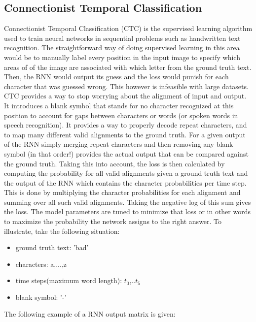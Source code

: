 \documentclass{article}
\begin{document}
\subsection{Connectionist Temporal Classification}
Connectionist Temporal Classification (CTC) is the supervised learning algorithm used to train neural networks in sequential problems such as handwritten text recognition\cite{Hannun}. The straightforward way of doing supervised learning in this area would be to manually label every position in the input image to specify which areas of of the image are associated with which letter from the ground truth text. Then, the RNN would output its guess and the loss would punish for each character that was guessed wrong. This however is infeasible with large datasets. CTC provides a way to stop worrying about the alignment of input and output. It introduces a blank symbol that stands for no character recognized at this position to account for gaps between characters or words (or spoken words in speech recognition). It provides a way to properly decode repeat characters, and to map many different valid alignments to the ground truth.
For a given output of the RNN simply merging repeat characters and then removing any blank symbol (in that order!) provides the actual output that can be compared against the ground truth. Taking this into account, the loss is then calculated by computing the probability for all valid alignments given a ground truth text and the output of the RNN which contains the character probabilities per time step. This is done by multiplying the character probabilities for each alignment and summing over all such valid alignments. Taking the negative log of this sum gives the loss. The model parameters are tuned to minimize that loss or in other words to maximize the probability the network assigns to the right answer. To illustrate, take the following situation:
\begin{itemize}
\item ground truth text: 'bad'
\item characters: a,...,z
\item time steps(maximum word length): \(t_0\),..\(t_5\)
\item blank symbol: '-'
\end{itemize}
The following example of a RNN output matrix is given:
\end{document}
